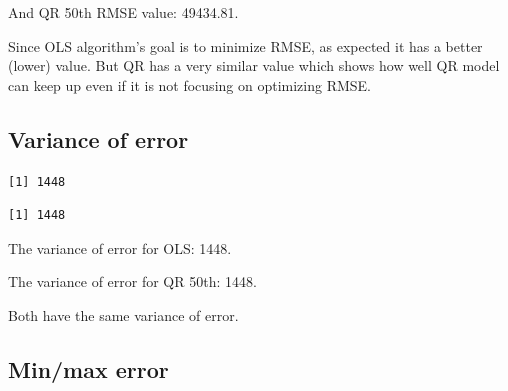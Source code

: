 \documentclass[
  letterpaper,
  DIV=11,
  numbers=noendperiod]{scrreprt}
\newenvironment{Shaded}{\begin{snugshade}}{\end{snugshade}}
\newcommand{\AttributeTok}[1]{\textcolor[rgb]{0.40,0.45,0.13}{#1}}
\newcommand{\CommentTok}[1]{\textcolor[rgb]{0.37,0.37,0.37}{#1}}
\newcommand{\DecValTok}[1]{\textcolor[rgb]{0.68,0.00,0.00}{#1}}
\newcommand{\FunctionTok}[1]{\textcolor[rgb]{0.28,0.35,0.67}{#1}}
\newcommand{\NormalTok}[1]{\textcolor[rgb]{0.00,0.23,0.31}{#1}}
\newcommand{\SpecialCharTok}[1]{\textcolor[rgb]{0.37,0.37,0.37}{#1}}
\begin{document}
And QR 50th RMSE value: 49434.81.

Since OLS algorithm's goal is to minimize RMSE, as expected it has a
better (lower) value. But QR has a very similar value which shows how
well QR model can keep up even if it is not focusing on optimizing RMSE.

\hypertarget{variance-of-error-1}{%
\subsection{Variance of error}\label{variance-of-error-1}}

\begin{Shaded}
\end{Shaded}

\begin{verbatim}
[1] 1448
\end{verbatim}

\begin{Shaded}
\end{Shaded}

\begin{verbatim}
[1] 1448
\end{verbatim}

The variance of error for OLS: 1448.

The variance of error for QR 50th: 1448.

Both have the same variance of error.

\hypertarget{minmax-error-1}{%
\subsection{Min/max error}\label{minmax-error-1}}

\begin{Shaded}
\end{Shaded}
\end{document}
